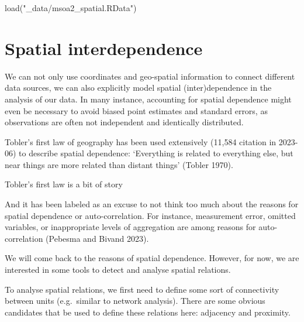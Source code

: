 \documentclass[
  letterpaper,
]{scrbook}
\newenvironment{Shaded}{\begin{snugshade}}{\end{snugshade}}
\newcommand{\FunctionTok}[1]{\textcolor[rgb]{0.28,0.35,0.67}{#1}}
\newcommand{\NormalTok}[1]{\textcolor[rgb]{0.00,0.23,0.31}{#1}}
\newcommand{\StringTok}[1]{\textcolor[rgb]{0.13,0.47,0.30}{#1}}
\begin{document}
\begin{Shaded}
\begin{Highlighting}[]
\FunctionTok{load}\NormalTok{(}\StringTok{"\_data/msoa2\_spatial.RData"}\NormalTok{)}
\end{Highlighting}
\end{Shaded}

\hypertarget{spatial-interdependence}{%
\section{Spatial interdependence}\label{spatial-interdependence}}

We can not only use coordinates and geo-spatial information to connect
different data sources, we can also explicitly model spatial
(inter)dependence in the analysis of our data. In many instance,
accounting for spatial dependence might even be necessary to avoid
biased point estimates and standard errors, as observations are often
not independent and identically distributed.

Tobler's first law of geography has been used extensively (11,584
citation in 2023-06) to describe spatial dependence: `Everything is
related to everything else, but near things are more related than
distant things' (Tobler 1970).

\begin{tcolorbox}[enhanced jigsaw, colframe=quarto-callout-note-color-frame, coltitle=black, titlerule=0mm, opacitybacktitle=0.6, toprule=.15mm, colbacktitle=quarto-callout-note-color!10!white, toptitle=1mm, leftrule=.75mm, colback=white, bottomtitle=1mm, opacityback=0, left=2mm, title=\textcolor{quarto-callout-note-color}{\faInfo}\hspace{0.5em}{Note}, breakable, arc=.35mm, rightrule=.15mm, bottomrule=.15mm]

Tobler's first law is a bit of story

And it has been labeled as an excuse to not think too much about the
reasons for spatial dependence or auto-correlation. For instance,
measurement error, omitted variables, or inappropriate levels of
aggregation are among reasons for auto-correlation (Pebesma and Bivand
2023).

\end{tcolorbox}

We will come back to the reasons of spatial dependence. However, for
now, we are interested in some tools to detect and analyse spatial
relations.

To analyse spatial relations, we first need to define some sort of
connectivity between units (e.g.~similar to network analysis). There are
some obvious candidates that be used to define these relations here:
adjacency and proximity.
\end{document}
